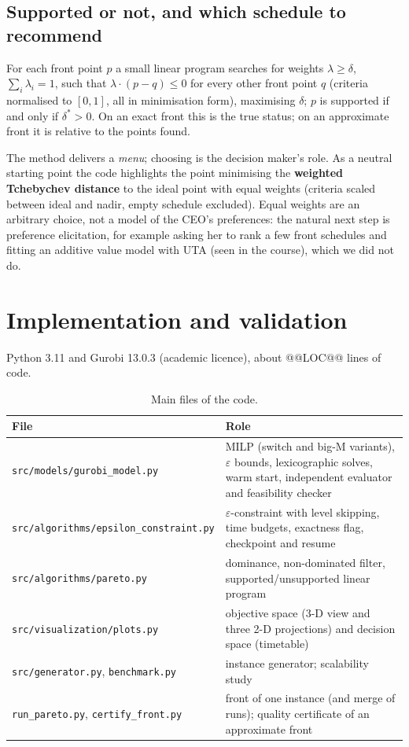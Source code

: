 \documentclass[11pt,a4paper]{article}
\theoremstyle{plain}
\newcommand{\eps}{\varepsilon}
\begin{document}
\subsection{Supported or not, and which schedule to recommend}

For each front point $p$ a small linear program searches for weights $\lambda\ge\delta$, $\sum_i\lambda_i=1$, such that $\lambda\cdot(p-q)\le 0$ for every other front point $q$ (criteria normalised to $[0,1]$, all in minimisation form), maximising $\delta$; $p$ is supported if and only if $\delta^*>0$. On an exact front this is the true status; on an approximate front it is relative to the points found.

The method delivers a \emph{menu}; choosing is the decision maker's role. As a neutral starting point the code highlights the point minimising the \textbf{weighted Tchebychev distance} to the ideal point with equal weights (criteria scaled between ideal and nadir, empty schedule excluded). Equal weights are an arbitrary choice, not a model of the CEO's preferences: the natural next step is preference elicitation, for example asking her to rank a few front schedules and fitting an additive value model with UTA (seen in the course), which we did not do.

\section{Implementation and validation}\label{sec:impl}

Python 3.11 and Gurobi 13.0.3 (academic licence), about @@LOC@@ lines of code.

\begin{table}[htbp]
\centering
\caption{Main files of the code.}\label{tab:files}
\small
\begin{tabularx}{\linewidth}{>{\raggedright\arraybackslash}p{5.4cm} X}
\toprule
File & Role \\
\midrule
\texttt{src/models/gurobi\_model.py} & MILP (switch and big-M variants), $\eps$ bounds, lexicographic solves, warm start, independent evaluator and feasibility checker \\
\texttt{src/algorithms/epsilon\_constraint.py} & $\eps$-constraint with level skipping, time budgets, exactness flag, checkpoint and resume \\
\texttt{src/algorithms/pareto.py} & dominance, non-dominated filter, supported/unsupported linear program \\
\texttt{src/visualization/plots.py} & objective space (3-D view and three 2-D projections) and decision space (timetable) \\
\texttt{src/generator.py}, \texttt{benchmark.py} & instance generator; scalability study \\
\texttt{run\_pareto.py}, \texttt{certify\_front.py} & front of one instance (and merge of runs); quality certificate of an approximate front \\
\bottomrule
\end{tabularx}
\end{table}
\end{document}
